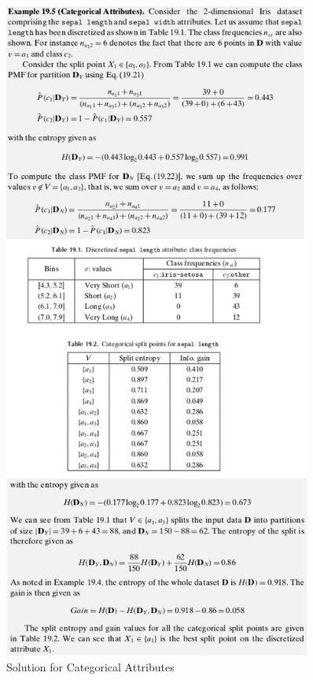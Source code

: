 \begin{figure}[H]
\centerline{\includegraphics[width=0.9\textwidth]{Figures/dt12}}
\caption{\label{fig:figure}Solution for Categorical Attributes}
\end{figure}
